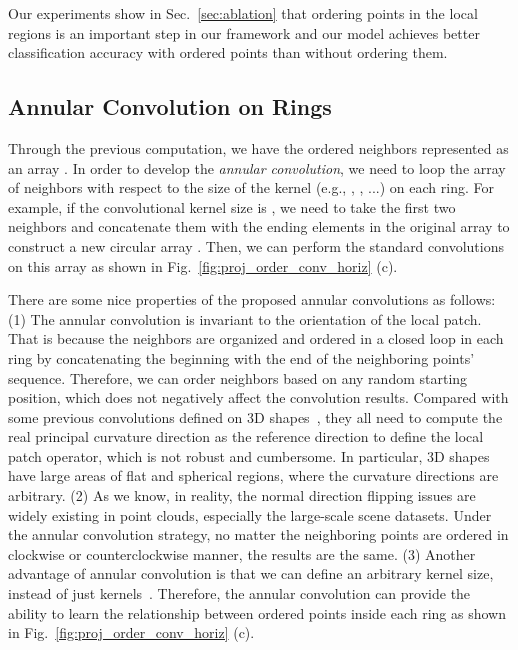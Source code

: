 \documentclass[10pt,twocolumn,letterpaper]{article}
\begin{document}
Our experiments show in Sec.~\ref{sec:ablation} that ordering points in the local regions is an important step in our framework and our model achieves better classification accuracy with ordered points than without ordering them.

\subsection{Annular Convolution on Rings}
\label{sec:annular_conv}
Through the previous computation, we have the ordered neighbors represented as an array . In order to develop the \emph{annular convolution}, we need to loop the array of neighbors with respect to the size of the kernel (e.g., , , ...) on each ring. For example, if the convolutional kernel size is , we need to take the first two neighbors and concatenate them with the ending elements in the original array to construct a new circular array . Then, we can perform the standard convolutions on this array as shown in Fig.~\ref{fig:proj_order_conv_horiz} (c).

There are some nice properties of the proposed annular convolutions as follows: (1) The annular convolution is invariant to the orientation of the local patch. That is because the neighbors are organized and ordered in a closed loop in each ring by concatenating the beginning with the end of the neighboring points' sequence. Therefore, we can order neighbors based on any random starting position, which does not negatively affect the convolution results. Compared with some previous convolutions defined on 3D shapes~\cite{boscaini2016learning,Xu_2017_ICCV,tatarchenko2018tangent}, they all need to compute the real principal curvature direction as the reference direction to define the local patch operator, which is not robust and cumbersome. In particular, 3D shapes have large areas of flat and spherical regions, where the curvature directions are arbitrary. (2) As we know, in reality, the normal direction flipping issues are widely existing in point clouds, especially the large-scale scene datasets. Under the annular convolution strategy, no matter the neighboring points are ordered in clockwise or counterclockwise manner, the results are the same. (3) Another advantage of annular convolution is that we can define an arbitrary kernel size, instead of just  kernels~\cite{qi2017pointnet,qi2017pointnet++}. Therefore, the annular convolution can provide the ability to learn the relationship between ordered points inside each ring as shown in Fig.~\ref{fig:proj_order_conv_horiz} (c).
\end{document}
